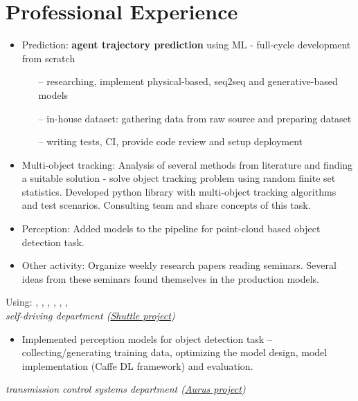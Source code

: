 \section*{Professional Experience}
% 
\begin{itemize}
    \item Prediction: \textbf{agent trajectory prediction} using ML - full-cycle development from scratch
          \begin{itemize}
              \item[--] researching, implement physical-based, seq2seq and generative-based models
              \item[--] in-house dataset: gathering data from raw source and preparing dataset
              \item[--] writing tests, CI, provide code review and setup deployment
          \end{itemize}
    \item Multi-object tracking: Analysis of several methods from literature and finding a suitable solution - solve object tracking problem using random finite set statistics. Developed python library with multi-object tracking algorithms and test scenarios. Consulting team and share concepts of this task.
    \item Perception: Added models to the pipeline for point-cloud based object detection task.
    \item Other activity: Organize weekly research papers reading seminars. Several ideas from these seminars found themselves in the production models.
\end{itemize}
Using: , , , , , , 
\horizontalline
% 
 \\
\textit{self-driving department (\href{https://www.engadget.com/2016/08/28/yandex-teams-on-self-driving-shuttle-bus/}{Shuttle project})}
\begin{itemize}
    \item Implemented perception models for object detection task -- collecting/generating training data, optimizing the model design, model implementation (Caffe DL framework) and evaluation.
\end{itemize}
\textit{transmission control systems department (\href{https://en.wikipedia.org/wiki/Aurus_Senat}{Aurus project})}
